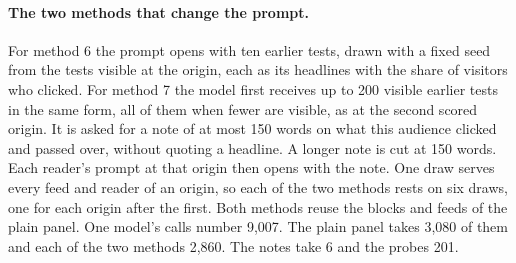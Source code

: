 \paragraph{The two methods that change the prompt.} For method 6 the prompt opens with ten earlier tests, drawn with a fixed seed from the tests visible at the origin, each as its headlines with the share of visitors who clicked. For method 7 the model first receives up to 200 visible earlier tests in the same form, all of them when fewer are visible, as at the second scored origin. It is asked for a note of at most 150 words on what this audience clicked and passed over, without quoting a headline. A longer note is cut at 150 words. Each reader's prompt at that origin then opens with the note. One draw serves every feed and reader of an origin, so each of the two methods rests on six draws, one for each origin after the first. Both methods reuse the blocks and feeds of the plain panel. One model's calls number 9,007. The plain panel takes 3,080 of them and each of the two methods 2,860. The notes take 6 and the probes 201.

